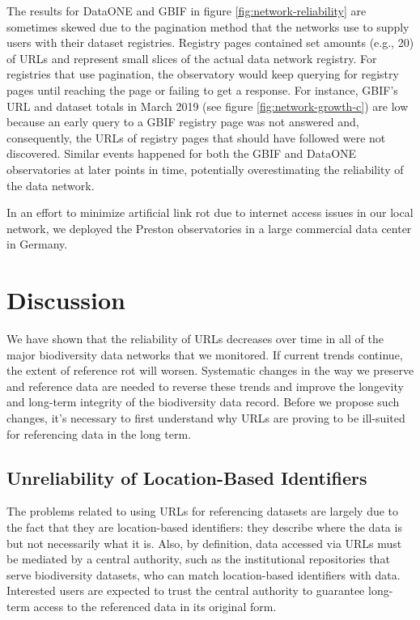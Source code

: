 The results for DataONE and GBIF in figure \ref{fig:network-reliability} are sometimes skewed due to the pagination method that the networks use to supply users with their dataset registries. Registry pages contained set amounts (e.g., 20) of URLs and represent small slices of the actual data network registry. For registries that use pagination, the observatory would keep querying for registry pages until reaching the page or failing to get a response. For instance, GBIF's URL and dataset totals in March 2019 (see figure \ref{fig:network-growth-c}) are low because an early query to a GBIF registry page was not answered and, consequently, the URLs of registry pages that should have followed were not discovered. Similar events happened for both the GBIF and DataONE observatories at later points in time, potentially overestimating the reliability of the data network.

In an effort to minimize artificial link rot due to internet access issues in our local network, we deployed the Preston observatories in a large commercial data center in Germany.



\section*{Discussion}
We have shown that the reliability of URLs decreases over time in all of the major biodiversity data networks that we monitored. If current trends continue, the extent of reference rot will worsen. Systematic changes in the way we preserve and reference data are needed to reverse these trends and improve the longevity and long-term integrity of the biodiversity data record. Before we propose such changes, it's necessary to first understand why URLs are proving to be ill-suited for referencing data in the long term.

\subsection*{Unreliability of Location-Based Identifiers}
The problems related to using URLs for referencing datasets are largely due to the fact that they are location-based identifiers: they describe where the data is but not necessarily what it is. Also, by definition, data accessed via URLs must be mediated by a central authority, such as the institutional repositories that serve biodiversity datasets, who can match location-based identifiers with data. Interested users are expected to trust the central authority to guarantee long-term access to the referenced data in its original form.

